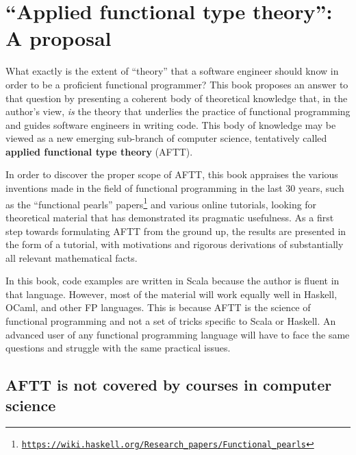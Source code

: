 
\chapter{\textsf{``}Applied functional type theory\textsf{''}: A proposal\label{chap:Applied-functional-type}}

What exactly is the extent of \textsf{``}theory\textsf{''} that a software engineer
should know in order to be a proficient functional programmer? This
book proposes an answer to that question by presenting a coherent
body of theoretical knowledge that, in the author\textsf{'}s view, \emph{is}
the theory that underlies the practice of functional programming and
guides software engineers in writing code. This body of knowledge
may be viewed as a new emerging sub-branch of computer science, tentatively
called \textbf{applied functional
type theory} (AFTT). 

In order to discover the proper scope of AFTT, this book appraises
the various inventions made in the field of functional programming
in the last 30 years, such as the \textquotedblleft functional pearls\textquotedblright{}
papers\footnote{\texttt{\href{https://wiki.haskell.org/Research_papers/Functional_pearls}{https://wiki.haskell.org/Research\_papers/Functional\_pearls}}}
and various online tutorials, looking for theoretical material that
has demonstrated its pragmatic usefulness. As a first step towards
formulating AFTT from the ground up, the results are presented in
the form of a tutorial, with motivations and rigorous derivations
of substantially all relevant mathematical facts.

In this book, code examples are written in Scala because the author
is fluent in that language. However, most of the material will work
equally well in Haskell, OCaml, and other FP languages. This is because
AFTT is the science of functional programming and not a set of tricks
specific to Scala or Haskell. An advanced user of any functional programming
language will have to face the same questions and struggle with the
same practical issues.

\section{AFTT is not covered by courses in computer science}


